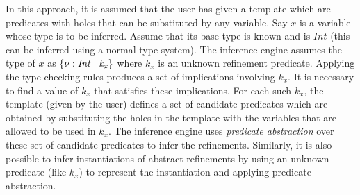 In this approach, it is assumed that the user has given a template which are predicates
with holes that can be substituted by any variable. 
Say $x$ is a variable whose type is to be inferred. Assume that its base type 
is known and is $Int$ (this can be inferred using a normal type system).
The inference engine assumes the type of $x$ as $\mathit{\{ \nu: Int \; | \; k_x\}}$ where $k_x$ 
is an unknown refinement predicate. 
Applying the type checking rules produces a set of implications involving $k_x$.
It is necessary to find a value of $k_x$ that satisfies these implications.
For each such $k_x$, the template (given by the user) defines a set of candidate predicates which are obtained 
by substituting the holes in the template with the variables that are allowed to be used in $k_x$.
The inference engine uses \emph{predicate abstraction} over these set of candidate predicates to infer the refinements.
Similarly, it is also possible to infer instantiations of abstract refinements by 
using an unknown predicate (like $k_x$) to represent the instantiation and applying predicate abstraction.

